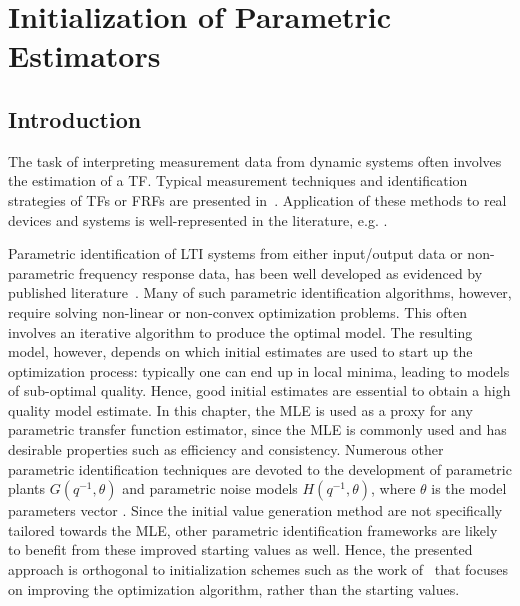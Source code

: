 \chapter{Initialization of Parametric Estimators}
\label{sec:initvals}
\gdef\thisDir{ch05-initvals}
\glsresetall
{}

\section{Introduction}
\label{sec:initial-values:introd}
The task of interpreting measurement data from dynamic systems often involves the estimation of a \gls{TF}. 
Typical measurement techniques and identification strategies of  \glspl{TF} or \glspl{FRF} are presented in~\citep{Schoukens1998,Schoukens2006LPM,Guillaume1996,Broersen1995,Pintelon2010LPM1,Antoni2007FRF}.
Application of these methods to real devices and systems is well-represented in the literature, e.g. \citep{Lim2010,Robinson1990,Behjat2010}.

Parametric identification of \gls{LTI} systems from either input/output data or non-parametric frequency response data, has been well developed as evidenced by published literature~\citep{Pintelon2012,Ljung1999,Schoukens1999,Pintelon1998}.
Many of such parametric identification algorithms, however, require solving non-linear or non-convex optimization problems.
This often involves an iterative algorithm to produce the optimal model.
 The resulting model, however, depends on which initial estimates are used to start up the optimization process: typically one can end up in local minima, leading to models of sub-optimal quality.
 Hence, good initial estimates are essential to obtain a high quality model estimate.
 In this chapter, the \gls{MLE} is used as a proxy for any parametric transfer function estimator, since the \gls{MLE} is commonly used and has desirable properties such as efficiency and consistency.
 Numerous other parametric identification techniques are devoted to the development of parametric plants $G(q^{-1},\theta)$ and parametric noise models  $H(q^{-1},\theta)$, where  $\theta$ is the model parameters vector  \citep{Ljung1999,Soderstrom1989,Pintelon2012}.
 Since the initial value generation method are not specifically tailored towards the \gls{MLE}, other parametric identification frameworks are likely to benefit from these improved starting values as well.
 Hence, the presented approach is orthogonal to initialization schemes such as the work of~\citet{vanHerpen2014} that focuses on improving the optimization algorithm, rather than the starting values.

